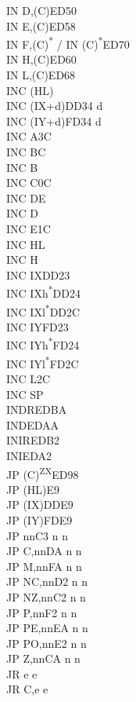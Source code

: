\documentclass[twoside,openright,a4paper]{book}
\begin{document}
\begin{multicols}{3}
{\begin{tabbing}
	IN D,(C)\>ED50\\
	IN E,(C)\>ED58\\
	IN F,(C)\textsuperscript{*} / IN (C)\textsuperscript{*}\>ED70\\
	IN H,(C)\>ED60\\
	IN L,(C)\>ED68\\
	INC (HL)\\
	INC (IX+d)\>DD34 d\\
	INC (IY+d)\>FD34 d\\
	INC A\>3C\\
	INC BC\\
	INC B\\
	INC C\>0C\\
	INC DE\\
	INC D\\
	INC E\>1C\\
	INC HL\\
	INC H\\
	INC IX\>DD23\\
	INC IXh\textsuperscript{*}\>DD24\\
	INC IXl\textsuperscript{*}\>DD2C\\
	INC IY\>FD23\\
	INC IYh\textsuperscript{*}\>FD24\\
	INC IYl\textsuperscript{*}\>FD2C\\
	INC L\>2C\\
	INC SP\\
	INDR\>EDBA\\
	IND\>EDAA\\
	INIR\>EDB2\\
	INI\>EDA2\\
	JP (C)\textsuperscript{ZX}\>ED98\\
	JP (HL)\>E9\\
	JP (IX)\>DDE9\\
	JP (IY)\>FDE9\\
	JP nn\>C3 n n\\
	JP C,nn\>DA n n\\
	JP M,nn\>FA n n\\
	JP NC,nn\>D2 n n\\
	JP NZ,nn\>C2 n n\\
	JP P,nn\>F2 n n\\
	JP PE,nn\>EA n n\\
	JP PO,nn\>E2 n n\\
	JP Z,nn\>CA n n\\
	JR e e\\
	JR C,e e\\

\end{tabbing}}
\end{multicols}
\end{document}
